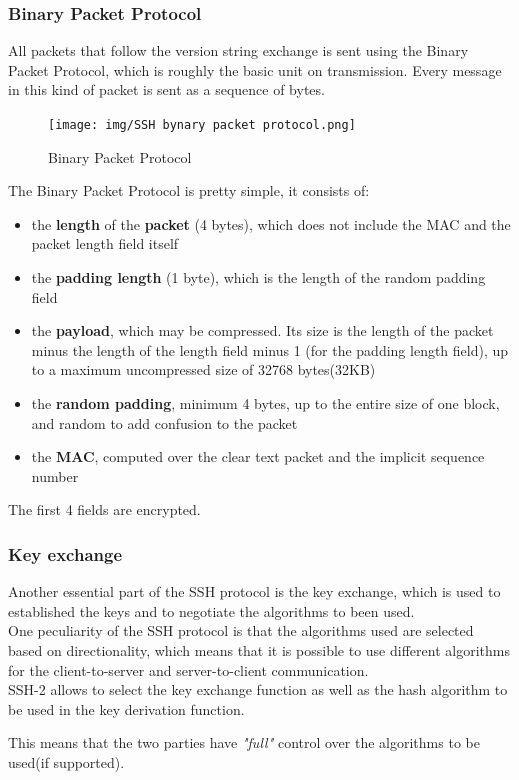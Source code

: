 \subsubsection{Binary Packet Protocol}
All packets that follow the version string exchange is sent using the
Binary Packet Protocol, which is roughly the basic unit on
transmission. Every message in this kind of packet is sent as a
sequence of bytes.
\begin{figure}[h]
  \centering
  \texttt{[image: img/SSH bynary packet
  protocol.png]}
  \caption{Binary Packet Protocol}
\end{figure}
The Binary Packet Protocol is pretty simple, it consists of:
\begin{itemize}
  \item the \textbf{length} of the \textbf{packet} (4 bytes), which
    does not include the MAC and the packet length field itself
  \item the \textbf{padding length} (1 byte), which is the length of
    the random padding field
  \item the \textbf{payload}, which may be compressed. Its size is the
    length of the packet minus the length of the length field minus 1
    (for the padding length field), up to a maximum uncompressed size
    of 32768 bytes(32KB)
  \item the \textbf{random padding}, minimum 4 bytes, up to the entire
    size of one block, and random to add confusion to the packet
  \item the \textbf{MAC}, computed over the clear text packet and the
    implicit sequence number
\end{itemize}
The first 4 fields are encrypted.

\subsubsection{Key exchange}
Another essential part of the SSH protocol is the key exchange, which 
is used to established the keys and to negotiate the algorithms to
been used.\\
One peculiarity of the SSH protocol is that the algorithms used are
selected based on directionality, which means that it is possible to
use different algorithms for the client-to-server and server-to-client
communication.\\
SSH-2 allows to select the key exchange function as well as the hash
algorithm to be used in the key derivation function. 
\begin{boxH}
  This means that the two parties have \textit{"full"} control over 
  the algorithms to be used(if supported).
\end{boxH}
  
